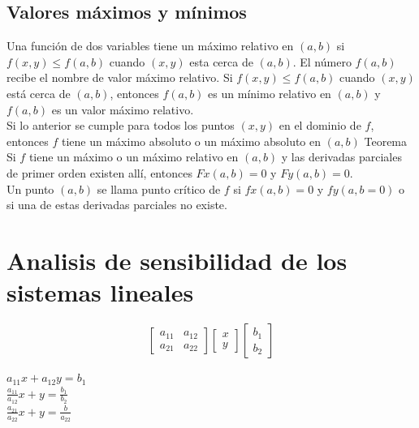 \subsection*{Valores m\'aximos y m\'inimos}
Una funci\'on de dos variables tiene un m\'aximo relativo en $(a,b)$ si $f(x,y)\leq f(a,b)$ cuando $(x,y)$ esta cerca de $(a,b)$. El n\'umero $f(a,b)$ recibe el nombre de valor m\'aximo relativo. Si $f(x,y)\leq f(a,b)$ cuando $(x,y)$ est\'a cerca de $(a,b)$, entonces $f(a,b)$ es un m\'inimo relativo en $(a,b)$ y $f(a,b)$ es un valor m\'aximo relativo.\\
Si lo anterior se cumple para todos los puntos $(x,y)$ en el dominio de $f$, entonces $f$ tiene un m\'aximo absoluto o un m\'aximo absoluto en $(a,b)$\smallskip 
Teorema\\
Si $f$ tiene un m\'aximo o un m\'aximo relativo en $(a,b)$ y las derivadas parciales de primer orden existen all\'i, entonces $Fx(a,b)=0$ y $Fy(a,b)=0$.\\
Un punto $(a,b)$ se llama punto cr\'itico de $f$ si $fx(a,b)=0$ y $fy(a,b=0)$ o si una de estas derivadas parciales no existe.

\section*{Analisis de sensibilidad de los sistemas lineales}
\begin{displaymath}
\begin{bmatrix}
a_{11} & a_{12} \\
a_{21} & a_{22}
\end{bmatrix}\begin{bmatrix}
x \\ y
\end{bmatrix}\begin{bmatrix}
b_1 \\ b_2
\end{bmatrix}
\end{displaymath}
\begin{center}
$a_{11}x+a_{12}y=b_1$\\
$\frac{a_{11}}{a_{12}}x+y=\frac{b_1}{b_2}$\\
$\frac{a_{21}}{a_{22}}x+y=\frac{b}{a_{22}}$
\end{center}
